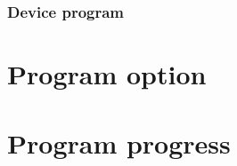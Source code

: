 
\subsubsection{Device program}
\label{app:sub:Device program}


\section{Program option}
\label{app:sec:Program option}


\section{Program progress}
\label{app:sec:Program progress}

